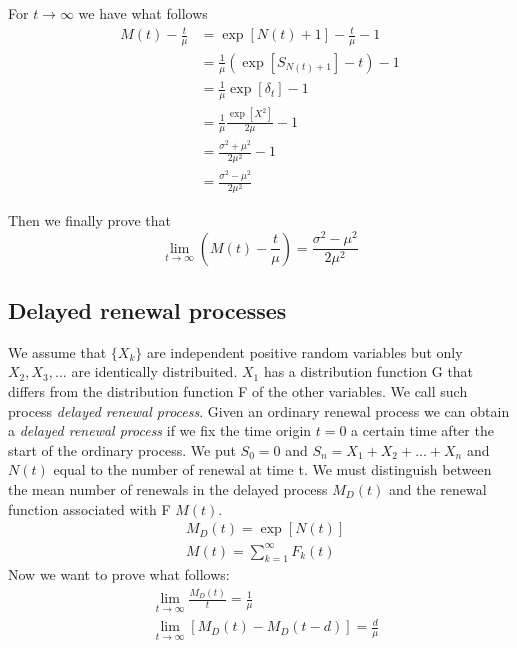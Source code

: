 For $t \rightarrow \infty$ we have what follows
\begin{align*}
	M(t)-\frac{t}{\mu} & =\exp[N(t)+1]-\frac{t}{\mu}-1 \\
	& = \frac{1}{\mu} (\exp[S_{N(t)+1}]-t)-1 \\
	& = \frac{1}{\mu} \exp[\delta_t]-1 \\
	& = \frac{1}{\mu}\frac{\exp[X^2]}{2\mu}-1 \\
	& = \frac{\sigma^2+\mu^2}{2\mu^2}-1 \\
	& = \frac{\sigma^2-\mu^2}{2\mu^2}
\end{align*}

Then we finally prove that
\begin{equation}
	\lim_{t \rightarrow \infty} \left( M(t) - \frac{t}{\mu} \right) = \frac{\sigma^2-\mu^2}{2\mu^2}
\end{equation}

\subsection{Delayed renewal processes}

We assume that $\{X_k\}$ are independent positive random variables but only $X_2,X_3,...$ are identically distribuited. $X_1$ has a distribution function G that differs from the distribution function F of the other variables. We call such process \textit{delayed renewal process}. Given an ordinary renewal process we can obtain a \textit{delayed renewal process} if we fix the time origin $t=0$ a certain time after the start of the ordinary process. We put $S_0=0$ and $S_n=X_1+X_2+...+X_n$ and $N(t)$ equal to the number of renewal at time t. We must distinguish between the mean number of renewals in the delayed process $M_D(t)$ and the renewal function associated with F $M(t)$.
\begin{align}
	& M_D(t) = \exp[N(t)]
	\\ & M(t) = \sum_{k=1}^{\infty}F_k(t)
\end{align}
Now we want to prove what follows:
\begin{align*}
	& \lim_{t \to \infty }\frac{M_D(t)}{t}=\frac{1}{\mu}
	\\ & \lim_{t \to \infty }[M_D(t)-M_D(t-d)]=\frac{d}{\mu}
\end{align*}

